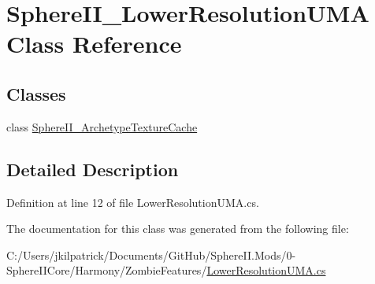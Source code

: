 \hypertarget{class_sphere_i_i___lower_resolution_u_m_a}{}\section{Sphere\+I\+I\+\_\+\+Lower\+Resolution\+U\+MA Class Reference}
\label{class_sphere_i_i___lower_resolution_u_m_a}
\subsection*{Classes}
\begin{DoxyCompactItemize}
\item 
class \mbox{\hyperlink{class_sphere_i_i___lower_resolution_u_m_a_1_1_sphere_i_i___archetype_texture_cache}{Sphere\+I\+I\+\_\+\+Archetype\+Texture\+Cache}}
\end{DoxyCompactItemize}


\subsection{Detailed Description}


Definition at line 12 of file Lower\+Resolution\+U\+M\+A.\+cs.



The documentation for this class was generated from the following file\+:\begin{DoxyCompactItemize}
\item 
C\+:/\+Users/jkilpatrick/\+Documents/\+Git\+Hub/\+Sphere\+I\+I.\+Mods/0-\/\+Sphere\+I\+I\+Core/\+Harmony/\+Zombie\+Features/\mbox{\hyperlink{_lower_resolution_u_m_a_8cs}{Lower\+Resolution\+U\+M\+A.\+cs}}\end{DoxyCompactItemize}
